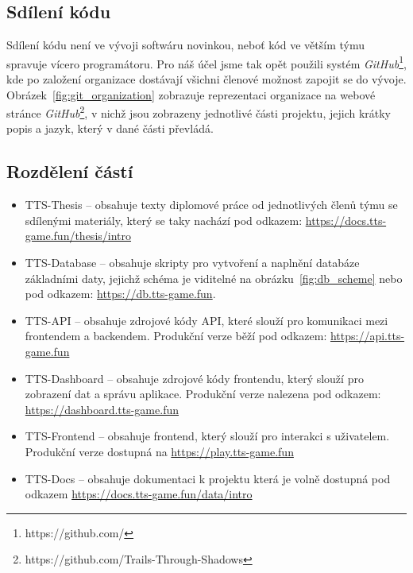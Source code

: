 \subsection{Sdílení kódu}
\label{subsec:implementation-collaboration-sharing}
Sdílení kódu není ve vývoji softwáru novinkou, neboť kód ve větším týmu spravuje vícero programátoru. Pro náš účel jsme tak opět použili systém \textit{GitHub}\footnote{https://github.com/}, kde po založení organizace dostávají všichni členové možnost zapojit se do vývoje. Obrázek~\ref{fig:git_organization} zobrazuje reprezentaci organizace na webové stránce \textit{GitHub}\footnote{https://github.com/Trails-Through-Shadows}, v nichž jsou zobrazeny jednotlivé části projektu, jejich krátky popis a jazyk, který v dané části převládá.

\subsection*{Rozdělení částí}
\label{subsec:implementation-collaboration-sharing-parts}

\begin{itemize}
    \item TTS-Thesis    -- obsahuje texty diplomové práce od jednotlivých členů týmu se sdílenými materiály, který se taky nachází pod odkazem: \url{https://docs.tts-game.fun/thesis/intro}
    \item TTS-Database  -- obsahuje skripty pro vytvoření a naplnění databáze základními daty, jejichž schéma je viditelné na obrázku~\ref{fig:db_scheme} nebo pod odkazem: \url{https://db.tts-game.fun}.
    \item TTS-API       -- obsahuje zdrojové kódy API, které slouží pro komunikaci mezi frontendem a backendem. Produkční verze běží pod odkazem: \url{https://api.tts-game.fun}
    \item TTS-Dashboard -- obsahuje zdrojové kódy frontendu, který slouží pro zobrazení dat a správu aplikace. Produkční verze nalezena pod odkazem: \url{https://dashboard.tts-game.fun}
    \item TTS-Frontend  -- obsahuje frontend, který slouží pro interakci s uživatelem. Produkční verze dostupná na \url{https://play.tts-game.fun}
    \item TTS-Docs      -- obsahuje dokumentaci k projektu která je volně dostupná pod odkazem \url{https://docs.tts-game.fun/data/intro}
\end{itemize}

